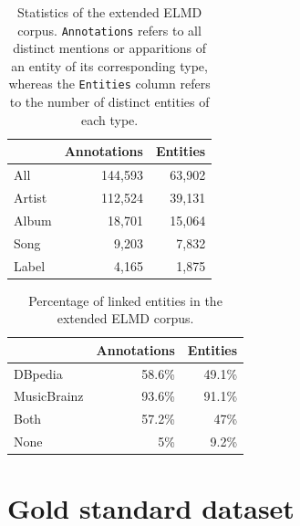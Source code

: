 \begin{table}[]
\centering
\begin{tabular}{ l r r }
\hline
& \textbf{Annotations} & \textbf{Entities} \\ \hline
All    & 144,593      & 63,902    \\ 
Artist & 112,524      & 39,131    \\ 
Album  & 18,701       & 15,064    \\ 
Song  & 9,203        & 7,832     \\ 
Label  & 4,165        & 1,875    
\\ \hline
\end{tabular}
\caption[Statistics of the extended ELMD corpus.]{Statistics of the extended ELMD corpus. \texttt{Annotations} refers to all distinct mentions or apparitions of an entity of its corresponding type, whereas the \texttt{Entities} column refers to the number of distinct entities of each type.}
\label{tbl:linking:elmd2}
\end{table}

\begin{table}[]
\centering
\begin{tabular}{ l r r }
\hline
& \textbf{Annotations} & \textbf{Entities} \\ \hline
DBpedia    & 58.6\%      & 49.1\%    \\ 
MusicBrainz & 93.6\%      & 91.1\%    \\
Both  & 57.2\%       & 47\%    \\ 
None & 5\%	& 9.2\% \\ \hline
\end{tabular}
\caption{Percentage of linked entities in the extended ELMD corpus.}
\label{tbl:linking:elmd2_percentage}
\end{table}


\section{Gold standard dataset}
\label{sec:linking:gold}

